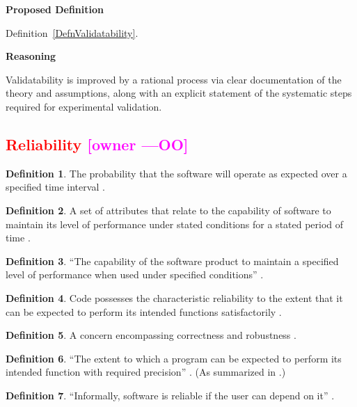 \documentclass[letterpaper,cleveref]{lipics-v2019}
\newcommand{\authornote}[3]{\textcolor{#1}{[#3 ---#2]}}
\newcommand{\authornote}[3]{}
\newcommand{\oo}[1]{\authornote{magenta}{OO}{#1}} %
\newcommand{\notdone}[1]{\textcolor{red}{#1}}
\theoremstyle{definition}
\newtheorem{defn}{Definition}
\begin{document}
\noindent \textbf{Proposed Definition}

Definition~\ref{DefnValidatability}.

\noindent \textbf{Reasoning}

Validatability is improved by a rational process via clear documentation of the
theory and assumptions, along with an explicit statement of the systematic steps
required for experimental validation.

\subsection{\notdone{Reliability} \oo{owner}}

\begin{defn}
  The probability that the software will operate as expected over a specified
  time interval \citep{GhezziEtAl2003}.
\end{defn}

\begin{defn}
  A set of attributes that relate to the capability of software to maintain its
  level of performance under stated conditions for a stated period of time
  \citep{berander2005software}.
\end{defn}

\begin{defn}
  ``The capability of the software product to maintain a specified level of
  performance when used under specified conditions''
  \citep{international2001iso}.
\end{defn}

\begin{defn}
  Code possesses the characteristic reliability to the extent that it can be
  expected to perform its intended functions satisfactorily
  \citep{boehm2007software}.
\end{defn}

\begin{defn}
  A concern encompassing correctness and robustness \citep{meyer1988object}.
\end{defn}

\begin{defn}
  ``The extent to which a program can be expected to perform its intended
  function with required precision'' \citep{McCallEtAl1977}. (As summarized in
  \citet{VanVliet2000}.)
\end{defn}

\begin{defn}
``Informally, software is reliable if the user can depend on it''
\citep{ghezzi1991fundamentals}.
\end{defn}
\end{document}
